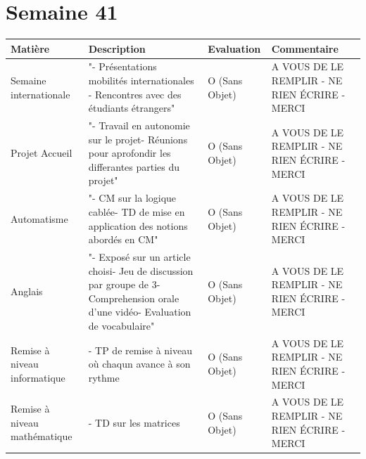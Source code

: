 \documentclass[12pt, openany]{report}
\begin{document}
\section*{Semaine 41}
\begin{tabular}{|l|l|l|l|}
\hline
Matière & Description & Evaluation & Commentaire \\ 
\hline
Semaine internationale & "- Présentations mobilités internationales - Rencontres avec des étudiants étrangers" & O (Sans Objet) & A VOUS DE LE REMPLIR - NE RIEN ÉCRIRE - MERCI \\ 
\hline
Projet Accueil & "- Travail en autonomie sur le projet- Réunions pour aprofondir les differantes parties du projet" & O (Sans Objet) & A VOUS DE LE REMPLIR - NE RIEN ÉCRIRE - MERCI \\ 
\hline
Automatisme & "- CM sur la logique cablée- TD de mise en application des notions abordés en CM" & O (Sans Objet) & A VOUS DE LE REMPLIR - NE RIEN ÉCRIRE - MERCI \\ 
\hline
Anglais & "- Exposé sur un article choisi- Jeu de discussion par groupe de 3- Comprehension orale d'une vidéo- Evaluation de vocabulaire" & O (Sans Objet) & A VOUS DE LE REMPLIR - NE RIEN ÉCRIRE - MERCI \\ 
\hline
Remise à niveau informatique & - TP de remise à niveau où chaqun avance à son rythme & O (Sans Objet) & A VOUS DE LE REMPLIR - NE RIEN ÉCRIRE - MERCI \\ 
\hline
Remise à niveau mathématique & - TD sur les matrices & O (Sans Objet) & A VOUS DE LE REMPLIR - NE RIEN ÉCRIRE - MERCI \\ 
\hline
\end{tabular}
\end{document}
